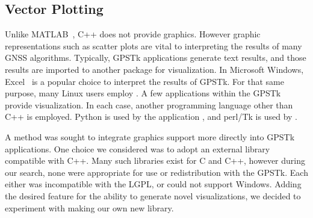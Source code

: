 \subsection*{Vector Plotting}

Unlike \mbox{MATLAB \textregistered}, C++ does not provide graphics.
However graphic representations such as scatter plots are vital to
interpreting the results of many GNSS algorithms. Typically, GPSTk
applications generate text results, and those results are imported to
another package for visualization. In Microsoft Windows, 
\mbox{Excel \texttrademark} is a popular choice to interpret the results of
GPSTk. For that same purpose, many Linux users employ
. A few applications within the GPSTk provide
visualization. In each case, another programming language other than
C++ is employed. Python is used by the application ,
and perl/Tk is used by .

A method was sought to integrate graphics support more directly into
GPSTk applications. One choice we considered was to adopt an external
library compatible with C++. Many such libraries exist for C and C++,
however during our search, none were appropriate for use or
redistribution with the GPSTk. Each either was incompatible with the
LGPL, or could not support Windows. Adding the desired feature for the
ability to generate novel visualizations, we decided to experiment
with making our own new library.

